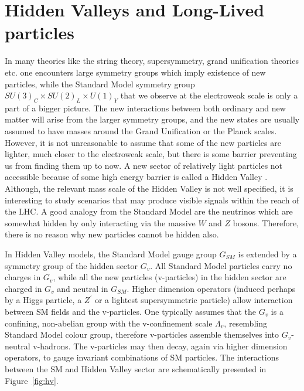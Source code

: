 \section{Hidden Valleys and Long-Lived particles}

In many theories like the string theory, supersymmetry, grand unification theories etc.
 one encounters large symmetry groups which imply existence of
new particles, while the Standard Model symmetry group $SU(3)_C \times SU(2)_L \times U(1)_Y$ 
 that we observe at the electroweak scale is only a part of a bigger picture.
The new interactions between
both ordinary and new matter will arise from the larger symmetry groups,  and  
the new states are usually
assumed to have masses around the Grand Unification or the Planck scales. However, it is not unreasonable
to assume that some of the new particles are lighter, much closer to the electroweak scale,
but there is some barrier preventing us from finding them up to now. A new sector
of relatively light particles not accessible because of some high energy barrier is called 
a Hidden Valley \cite{Strassler:2006im,Strassler:2006qa}.
Although, the relevant mass scale of the Hidden Valley is not well
specified, it is interesting to study scenarios that may produce visible signals within 
the reach of the LHC.
A good analogy from the Standard Model are 
the neutrinos which are somewhat hidden by only interacting via the massive $W$ and $Z$ bosons.
Therefore, there is no reason why new particles cannot be hidden also. 

In Hidden Valley models, the Standard Model gauge group $G_{SM}$ is extended by a symmetry 
group of the hidden sector $G_v$. 
All Standard Model particles carry no charges in $G_v$, while
all the new particles (v-particles) in the hidden sector are charged in $G_v$ and neutral 
in $G_{SM}$. Higher dimension operators (induced perhaps by a Higgs particle, a $Z^{'}$ or
a lightest supersymmetric particle) allow interaction between SM fields and the v-particles.
One typically assumes that the $G_v$ is a confining, non-abelian group with the
v-confinement scale $\Lambda_v$, resembling Standard Model colour group,
therefore v-particles assemble themselves into $G_v$-neutral v-hadrons.
The v-particles may then decay, again via higher dimension operators, to gauge invariant 
combinations of SM particles. The interactions between the SM and Hidden Valley sector are
schematically presented in Figure~\ref{fig:hv}. 

